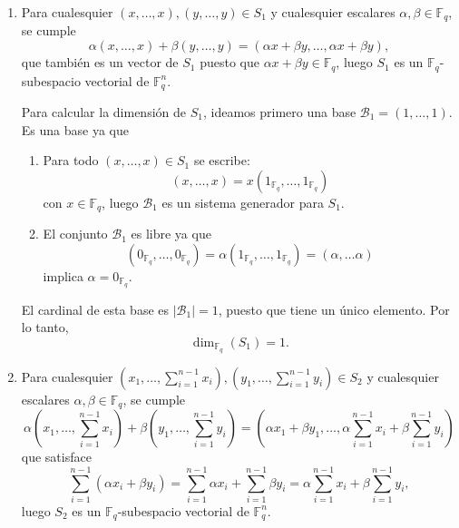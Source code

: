 \begin{enumerate}[label=\alph*)]
	\item Para cualesquier $(x,\dots,x),(y,\dots,y)\in S_1$ y cualesquier escalares $\alpha,\beta\in\mathbb{F}_q$, se cumple
	\[\alpha(x,\dots,x) + \beta(y,\dots,y) = (\alpha x + \beta y,\dots,\alpha x + \beta y),\]
	que también es un vector de $S_1$ puesto que $\alpha x + \beta y \in\mathbb{F}_q$, luego $S_1$ es un $\mathbb{F}_q$-subespacio vectorial de $\mathbb{F}_q^n$.
	
	Para calcular la dimensión de $S_1$, ideamos primero una base $\mathcal{B}_1 = (1,\dots,1)$. Es una base ya que
	\begin{enumerate}[label=\arabic*)]
		\item Para todo $(x,\dots,x)\in S_1$ se escribe:
		\[(x,\dots,x) = x(1_{\mathbb{F}_q},\dots,1_{\mathbb{F}_q})\]
		con $x\in\mathbb{F}_q$, luego $\mathcal{B}_1$ es un sistema generador para $S_1$.
		\item El conjunto $\mathcal{B}_1$ es libre ya que
		\[(0_{\mathbb{F}_q},\dots,0_{\mathbb{F}_q}) = \alpha(1_{\mathbb{F}_q},\dots,1_{\mathbb{F}_q}) = (\alpha,\dots\alpha)\]
		implica $\alpha=0_{\mathbb{F}_q}$.
	\end{enumerate}
	El cardinal de esta base es $|\mathcal{B}_1| = 1$, puesto que tiene un único elemento. Por lo tanto,
	\[\dim_{\mathbb{F}_q}(S_1) = 1.\]
	
	\item Para cualesquier $(x_1,\dots,\sum_{i=1}^{n-1}x_i),(y_1,\dots,\sum_{i=1}^{n-1}y_i)\in S_2$ y cualesquier escalares $\alpha,\beta\in\mathbb{F}_q$, se cumple
	\[\alpha(x_1,\dots,\sum_{i=1}^{n-1}x_i) + \beta(y_1,\dots,\sum_{i=1}^{n-1}y_i) = (\alpha x_1 + \beta y_1,\dots,\alpha \sum_{i=1}^{n-1}x_i + \beta \sum_{i=1}^{n-1}y_i)\]
	que satisface
	\[\sum_{i=1}^{n-1}(\alpha x_i + \beta y_i) = \sum_{i=1}^{n-1}\alpha x_i + \sum_{i=1}^{n-1}\beta y_i = \alpha \sum_{i=1}^{n-1}x_i + \beta \sum_{i=1}^{n-1}y_i,\]
	luego $S_2$ es un $\mathbb{F}_q$-subespacio vectorial de $\mathbb{F}_q^n$.
	

\end{enumerate}
